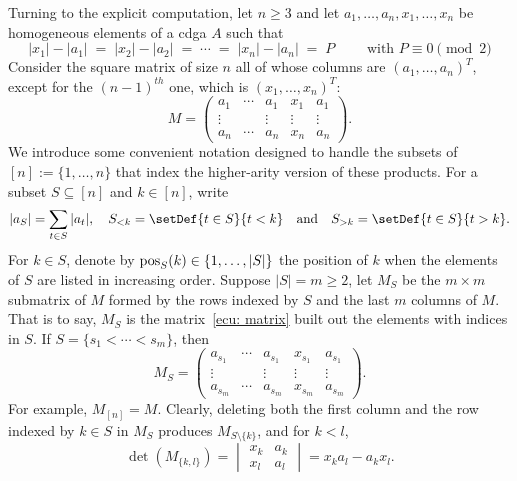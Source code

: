 \documentclass[11pt]{article}
\theoremstyle{definition}
\theoremstyle{definition}
\begin{document}
\smallskip

Turning to the explicit computation, let $n\geq 3$ and let $a_1,\ldots,a_n,x_1,\ldots,x_n$ be homogeneous elements of a cdga $A$ such that
\begin{equation}
\label{parity_conditions}
|x_1|-|a_1| \; = \; |x_2|-|a_2| \; = \;\cdots \; = \;|x_n|-|a_n| \; = \;  P \qquad \mbox{ with $P \equiv 0 \pmod{2}$} 
\end{equation}
Consider the square matrix of size $n$ all of whose columns are $(a_1,\ldots,a_n)^T$,
except for the $(n-1)^{th}$ one, which is $(x_1,\ldots,x_n)^T$:
\begin{equation}
\label{ecu: matrix}
M=\begin{pmatrix}
a_1 & \cdots & a_1 & x_1 & a_1 \\
\vdots & & \vdots & \vdots & \vdots \\
a_n & \cdots & a_n & x_n & a_n
\end{pmatrix}.
\end{equation}
We introduce some convenient notation designed to handle the subsets of $[n]:=\{1,\ldots,n\}$
that index the higher-arity version of these products.
For a subset $S\subseteq[n]$ and $k\in[n]$, write
\begin{equation*}
|a_S|=\sum_{t\in S}|a_t|, \quad S_{<k}=\setDef{t\in S}{ t<k} \quad \text{and} \quad
S_{>k}= \setDef{t\in S}{ t >k }.
\end{equation*}
For $k\in S$, denote by $\operatorname{\mathrm{pos}}_S(k)\in\{1,\ldots,|S|\}$ the position of $k$
when the elements of $S$ are listed in increasing order.
Suppose $|S| = m\geq 2$, let $M_S$ be the $m \times m$ submatrix of $M$
formed by the rows indexed by $S$ and the last $m$ columns of $M$.
That is to say, $M_S$ is the matrix~\eqref{ecu: matrix} built out the elements with indices in $S$.
If $S=\{s_1<\cdots<s_m\}$, then
\begin{equation*}
M_S=\begin{pmatrix}
a_{s_1} & \cdots & a_{s_1} & x_{s_1} & a_{s_1} \\
\vdots & & \vdots & \vdots & \vdots \\
a_{s_m} & \cdots & a_{s_m} & x_{s_m} & a_{s_m}
\end{pmatrix}.
\end{equation*}
For example, $M_{[n]}=M$.
Clearly, deleting both the first column and the row indexed by $k\in S$ in $M_S$  produces $M_{S\setminus\{k\}}$,
and for $k<l$,
\begin{equation*}
\det\left(M_{\{k,l\}}\right)=\begin{vmatrix} x_k & a_k\\ x_l & a_l\end{vmatrix}= x_ka_l-a_kx_l .
\end{equation*}
\end{document}
